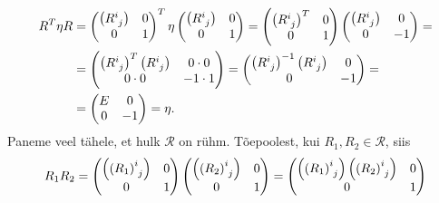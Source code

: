 \documentclass[12pt,a4paper,oneside]{article}
\theoremstyle{plain}
\theoremstyle{definition}
\numberwithin{equation}{section}
\begin{document}
\begin{align*}
R^T \eta R &= 
\begin{pmatrix}
\left(R\indices{^i_j}\right) & 0 \\ 
0 & 1 \\ 
\end{pmatrix}^T \eta \begin{pmatrix}
\left(R\indices{^i_j}\right) & 0 \\ 
0 & 1 \\ 
\end{pmatrix} = 
\begin{pmatrix}
\left(R\indices{^i_j}\right)^T & 0 \\ 
0 & 1 \\ 
\end{pmatrix} \begin{pmatrix}
\left(R\indices{^i_j}\right) & 0 \\ 
0 & -1 \\ 
\end{pmatrix} = \\
&= \begin{pmatrix}
\left(R\indices{^i_j}\right)^T 
\left(R\indices{^i_j}\right) & 0 \cdot 0 \\ 
0 \cdot 0  & -1 \cdot 1 \\ 
\end{pmatrix} = 
\begin{pmatrix}
\left(R\indices{^i_j}\right)^{-1} 
\left(R\indices{^i_j}\right) & 0 \\ 
0  & -1 \\ 
\end{pmatrix} = \\
&= \begin{pmatrix}
E & 0 \\ 
0  & -1 \\ 
\end{pmatrix} = \eta.
\end{align*}
Paneme veel tähele, et hulk $\mathcal{R}$ on rühm. 
Tõepoolest, kui $R_1, R_2 \in \mathcal{R}$, siis 
\begin{align*}
R_1 R_2 = \begin{pmatrix}
\left(\left(R_1\right)\indices{^i_j}\right) & 0 \\ 
0 & 1 \\ \end{pmatrix} \begin{pmatrix}
\left(\left(R_2\right)\indices{^i_j}\right) & 0 \\ 
0 & 1 \\ \end{pmatrix} = 
\begin{pmatrix}
\left(\left(R_1\right)\indices{^i_j}\right) 
\left(\left(R_2\right)\indices{^i_j}\right) & 0 \\ 
0 & 1 \\ \end{pmatrix}
\end{align*}
\end{document}
